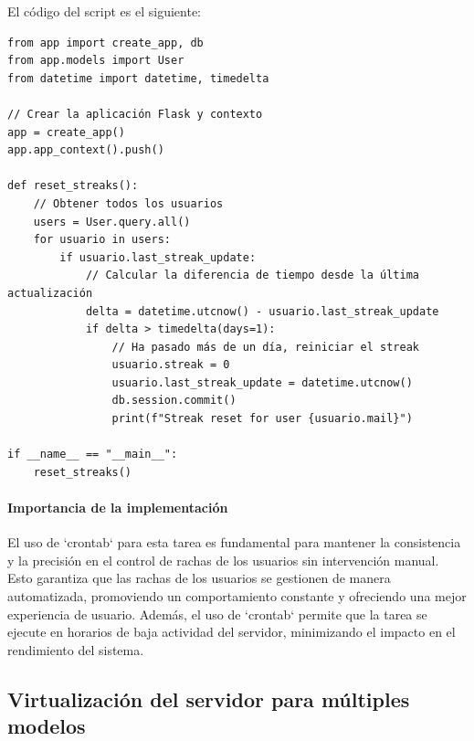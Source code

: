 \noindent
El código del script es el siguiente:


\begin{lstlisting}[caption={Script de restablecimiento de streaks en Flask}, label={lst:reset_streaks}]
from app import create_app, db
from app.models import User
from datetime import datetime, timedelta

// Crear la aplicación Flask y contexto
app = create_app()
app.app_context().push()

def reset_streaks():
    // Obtener todos los usuarios
    users = User.query.all()
    for usuario in users:
        if usuario.last_streak_update:
            // Calcular la diferencia de tiempo desde la última actualización
            delta = datetime.utcnow() - usuario.last_streak_update
            if delta > timedelta(days=1):
                // Ha pasado más de un día, reiniciar el streak
                usuario.streak = 0
                usuario.last_streak_update = datetime.utcnow()
                db.session.commit()
                print(f"Streak reset for user {usuario.mail}")

if __name__ == "__main__":
    reset_streaks()
\end{lstlisting}

\paragraph{Importancia de la implementación}

El uso de `crontab` para esta tarea es fundamental para mantener la consistencia y la precisión en el control de rachas de los usuarios sin intervención manual. Esto garantiza que las rachas de los usuarios se gestionen de manera automatizada, promoviendo un comportamiento constante y ofreciendo una mejor experiencia de usuario. Además, el uso de `crontab` permite que la tarea se ejecute en horarios de baja actividad del servidor, minimizando el impacto en el rendimiento del sistema.


\subsection{Virtualización del servidor para múltiples modelos}

